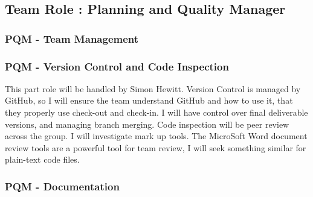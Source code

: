 \documentclass{article}
\begin{document}
\newpage
\subsection{Team Role : Planning and Quality Manager}

\subsubsection{PQM - Team Management}
\subsubsection{PQM - Version Control and Code Inspection}
This part role will be handled by Simon Hewitt. Version Control is managed by GitHub, so I will ensure the team understand GitHub and how to use it, that they properly use check-out and check-in. I will have control over final deliverable versions, and managing branch merging.
Code inspection will be peer review across the group. I will investigate mark up tools. The MicroSoft Word document review tools are a powerful tool for team review, I will seek something similar for plain-text code files. 
\subsubsection{PQM - Documentation}
\end{document}
